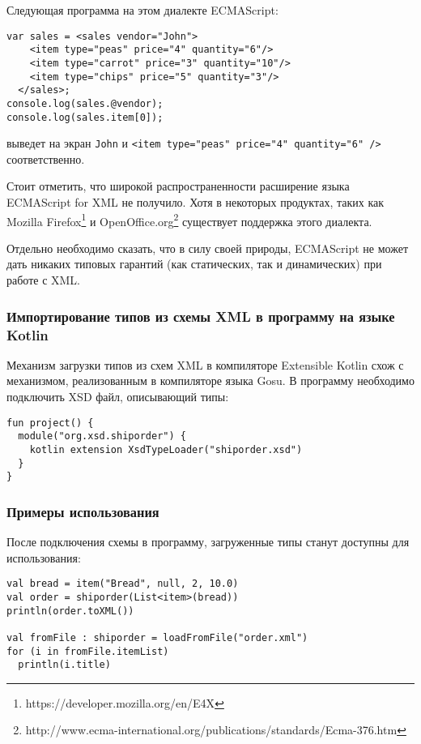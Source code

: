 Следующая программа на этом диалекте ECMAScript:

\begin{code}
\begin{lstlisting}[caption={Пример использования XML литеров в языке ECMAScript for XML.}, label=e4x-xml-example]
var sales = <sales vendor="John">
    <item type="peas" price="4" quantity="6"/>
    <item type="carrot" price="3" quantity="10"/>
    <item type="chips" price="5" quantity="3"/>
  </sales>;
console.log(sales.@vendor);
console.log(sales.item[0]);
\end{lstlisting}
выведет на экран \texttt{John} и \texttt{<item type="peas"\ price="4"\ quantity="6"\ />} соответственно.
\end{code}

Стоит отметить, что широкой распространенности расширение языка ECMAScript for XML не получило.
Хотя в некоторых продуктах, таких как Mozilla Firefox\footnote{https://developer.mozilla.org/en/E4X} и
OpenOffice.org\footnote{http://www.ecma-international.org/publications/standards/Ecma-376.htm} существует поддержка этого диалекта.

Отдельно необходимо сказать, что в силу своей природы, ECMAScript не может дать никаких типовых гарантий (как статических, так и динамических) при работе с XML.

\subsubsection{Импортирование типов из схемы XML в программу на языке Kotlin}
Механизм загрузки типов из схем XML в компиляторе Extensible Kotlin схож с механизмом, реализованным в компиляторе языка Gosu.
В программу необходимо подключить XSD файл, описывающий типы:
\begin{code}\begin{lstlisting}[caption={Подключение XML схемы в программу на языке Kotlin.}, label={xsd-type-loading-extension-point}]
fun project() {
  module("org.xsd.shiporder") {
    kotlin extension XsdTypeLoader("shiporder.xsd")
  }
}
\end{lstlisting}\end{code}

\begin{code}
\subsubsection{Примеры использования}
После подключения схемы в программу, загруженные типы станут доступны для использования:

\begin{lstlisting}[caption={Пример использования типов, загруженных из XML схемы в языке Kotlin.}, label=kotlin-simple-xml-example]
val bread = item("Bread", null, 2, 10.0)
val order = shiporder(List<item>(bread))
println(order.toXML())

val fromFile : shiporder = loadFromFile("order.xml")
for (i in fromFile.itemList)
  println(i.title)
\end{lstlisting}\end{code}

